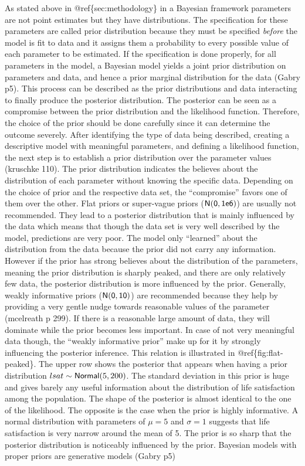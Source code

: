 \documentclass[a4, 12pt]{article}
\begin{document}
\label{sec:priors}
As stated above in @ref\{sec:methodology\} in a Bayesian framework parameters are not point estimates but they have distributions. The specification for these parameters are called prior distribution because they must be specified \emph{before} the model is fit to data and it assigns them a probability to every possible value of each parameter to be estimated. If the specification is done properly, for all parameters in the model, a Bayesian model yields a joint prior distribution on parameters and data, and hence a prior marginal distribution for the data (Gabry p5). This process can be described as the prior distributions and data interacting to finally produce the posterior distribution. The posterior can be seen as a compromise between the prior distribution and the likelihood function. Therefore, the choice of the prior should be done carefully since it can determine the outcome severely. After identifying the type of data being described, creating a descriptive model with meaningful parameters, and defining a likelihood function, the next step is to establish a prior distribution over the parameter values (kruschke 110). The prior distribution indicates the believes about the distribution of each parameter without knowing the specific data. Depending on the choice of prior and the respective data set, the ``compromise'' favors one of them over the other. Flat priors or super-vague priors (\(\sf {N}(0,1e6)\)) are usually not recommended. They lead to a posterior distribution that is mainly influenced by the data which means that though the data set is very well described by the model, predictions are very poor. The model only ``learned'' about the distribution from the data because the prior did not carry any information. However if the prior has strong believes about the distribution of the parameters, meaning the prior distribution is sharply peaked, and there are only relatively few data, the posterior distribution is more influenced by the prior. Generally, weakly informative priors (\(\sf{N}(0,10)\)) are recommended because they help by providing a very gentle nudge towards reasonable values of the parameter (mcelreath p 299). If there is a reasonable large amount of data, they will dominate while the prior becomes less important. In case of not very meaningful data though, the ``weakly informative prior'' make up for it by strongly influencing the posterior inference. This relation is illustrated in @ref\{fig:flat-peaked\}. The upper row shows the posterior that appears when having a prior distribution \(lsat \sim {\sf Normal}(5, 200)\). The standard deviation in this prior is huge and gives barely any useful information about the distribution of life satisfaction among the population. The shape of the posterior is almost identical to the one of the likelihood. The opposite is the case when the prior is highly informative. A normal distribution with parameters of \(\mu = 5\) and \(\sigma = 1\) suggests that life satisfaction is very narrow around the mean of 5. The prior is so sharp that the posterior distribution is noticeably influenced by the prior. Bayesian models with proper priors are generative models (Gabry p5)
\end{document}
